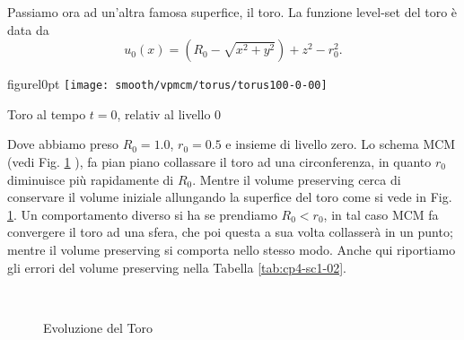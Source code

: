 \newpage
Passiamo ora ad un'altra famosa superfice, il toro. La funzione
level-set del toro è data da
\[
u_0(x) = \left(R_0-\sqrt{x^2+y^2}\right)+z^2-r_0^2.
\]

\begin{wrapfloat}{figure}{l}{0pt}
\texttt{[image: smooth/vpmcm/torus/torus100-0-00]}
\caption{Toro al tempo $t=0$, relativ al livello $0$}
\end{wrapfloat}

Dove abbiamo preso $R_0=1.0$, $r_0=0.5$ e insieme di livello zero. Lo
schema MCM (vedi Fig. \ref{fig:cp4-sc1-02} ), fa pian piano collassare
il toro ad una circonferenza, in quanto $r_0$ diminuisce più rapidamente di
$R_0$.  Mentre il volume preserving cerca di conservare il volume
iniziale  allungando la superfice del toro come si vede in
Fig. \ref{fig:cp4-sc1-02}. Un comportamento diverso si ha se
prendiamo $R_0<r_0$, in tal caso MCM  fa convergere il toro ad una
sfera, che poi questa a sua volta collasserà in un punto; mentre il
volume preserving si comporta nello stesso modo. Anche qui riportiamo
gli errori del volume preserving nella Tabella \ref{tab:cp4-sc1-02}.

\begin{figure}[htb!]
  \centering
  \quad
  \\
  \quad
  \quad
  \caption{Evoluzione del Toro}
  \label{fig:cp4-sc1-02}
\end{figure}

